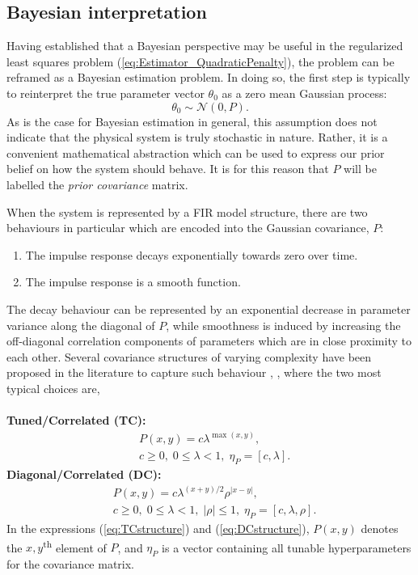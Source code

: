 \subsection{Bayesian interpretation}

Having established that a Bayesian perspective may be useful in the regularized least squares problem (\ref{eq:Estimator_QuadraticPenalty}), the problem can be reframed as a Bayesian estimation problem. In doing so, the first step is typically to reinterpret the true parameter vector $\theta_0$ as a zero mean Gaussian process:
\begin{equation}
\theta_0 \sim \mathcal{N}(0,P).
\end{equation}
As is the case for Bayesian estimation in general, this assumption does not indicate that the physical system is truly stochastic in nature. Rather, it is a convenient mathematical abstraction which can be used to express our prior belief on how the system should behave. It is for this reason that $P$ will be labelled the \emph{prior covariance} matrix. 

When the system is represented by a FIR model structure, there are two behaviours in particular which are encoded into the Gaussian covariance, $P$:
\begin{enumerate}
\item The impulse response decays exponentially towards zero over time.
\item The impulse response is a smooth function.
\end{enumerate} 
The decay behaviour can be represented by an exponential decrease in parameter variance along the diagonal of $P$, while smoothness is induced by increasing the off-diagonal correlation components of parameters which are in close proximity to each other. Several covariance structures of varying complexity have been proposed in the literature to capture such behaviour \cite{Pillonetto2010}, \cite{Chen2011}, where the two most typical choices are, \\ \\
\textbf{Tuned/Correlated (TC): }
\begin{equation}
\begin{split}
\label{eq:TCstructure}
&P(x,y) = c \lambda^{\max(x,y)}, \\
&c \geq 0, \; 0 \leq \lambda < 1, \; \eta_P = [c,\lambda].
\end{split}
\end{equation}
\textbf{Diagonal/Correlated (DC):}
\begin{equation}
\begin{split}
\label{eq:DCstructure}
&P(x,y) = c \lambda^{(x+y)/2} \rho^{|x-y|}, \\
&c \geq 0, \; 0 \leq \lambda < 1, \; |\rho| \leq 1, \; \eta_P = [c,\lambda, \rho].
\end{split}
\end{equation}
In the expressions (\ref{eq:TCstructure}) and (\ref{eq:DCstructure}), $P(x,y)$ denotes the $x,y$\textsuperscript{th} element of $P$, and $\eta_P$ is a vector containing all tunable hyperparameters for the covariance matrix.

